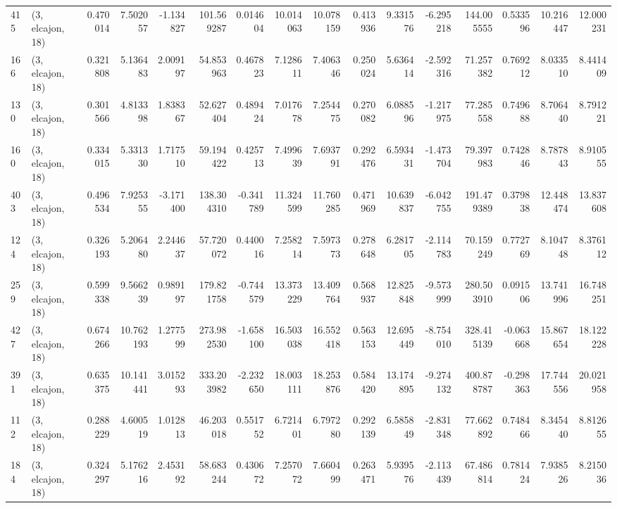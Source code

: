 \begin{tabular}{llrrrrrrrrrrrrrr}
415 &  (3, elcajon, 18) &   0.470014 &   7.502057 &  -1.134827 &   101.569287 &   0.014604 &  10.014063 &  10.078159 &  0.413936 &   9.331576 &  -6.295218 &   144.005555 &  0.533596 &  10.216447 &  12.000231 \\
166 &  (3, elcajon, 18) &   0.321808 &   5.136483 &   2.009197 &    54.853963 &   0.467823 &   7.128611 &   7.406346 &  0.250024 &   5.636414 &  -2.592316 &    71.257382 &  0.769212 &   8.033510 &   8.441409 \\
130 &  (3, elcajon, 18) &   0.301566 &   4.813398 &   1.838367 &    52.627404 &   0.489424 &   7.017678 &   7.254475 &  0.270082 &   6.088596 &  -1.217975 &    77.285558 &  0.749688 &   8.706440 &   8.791221 \\
160 &  (3, elcajon, 18) &   0.334015 &   5.331330 &   1.717510 &    59.194422 &   0.425713 &   7.499639 &   7.693791 &  0.292476 &   6.593431 &  -1.473704 &    79.397983 &  0.742846 &   8.787843 &   8.910555 \\
403 &  (3, elcajon, 18) &   0.496534 &   7.925355 &  -3.171400 &   138.304310 &  -0.341789 &  11.324599 &  11.760285 &  0.471969 &  10.639837 &  -6.042755 &   191.479389 &  0.379838 &  12.448474 &  13.837608 \\
124 &  (3, elcajon, 18) &   0.326193 &   5.206480 &   2.244637 &    57.720072 &   0.440016 &   7.258214 &   7.597373 &  0.278648 &   6.281705 &  -2.114783 &    70.159249 &  0.772769 &   8.104748 &   8.376112 \\
259 &  (3, elcajon, 18) &   0.599338 &   9.566239 &   0.989197 &   179.821758 &  -0.744579 &  13.373229 &  13.409764 &  0.568937 &  12.825848 &  -9.573999 &   280.503910 &  0.091506 &  13.741996 &  16.748251 \\
427 &  (3, elcajon, 18) &   0.674266 &  10.762193 &   1.277599 &   273.982530 &  -1.658100 &  16.503038 &  16.552418 &  0.563153 &  12.695449 &  -8.754010 &   328.415139 & -0.063668 &  15.867654 &  18.122228 \\
391 &  (3, elcajon, 18) &   0.635375 &  10.141441 &   3.015293 &   333.203982 &  -2.232650 &  18.003111 &  18.253876 &  0.584420 &  13.174895 &  -9.274132 &   400.878787 & -0.298363 &  17.744556 &  20.021958 \\
112 &  (3, elcajon, 18) &   0.288229 &   4.600519 &   1.012813 &    46.203018 &   0.551752 &   6.721401 &   6.797280 &  0.292139 &   6.585849 &  -2.831348 &    77.662892 &  0.748466 &   8.345440 &   8.812655 \\
184 &  (3, elcajon, 18) &   0.324297 &   5.176216 &   2.453192 &    58.683244 &   0.430672 &   7.257072 &   7.660499 &  0.263471 &   5.939576 &  -2.113439 &    67.486814 &  0.781424 &   7.938526 &   8.215036 \\

\end{tabular}
